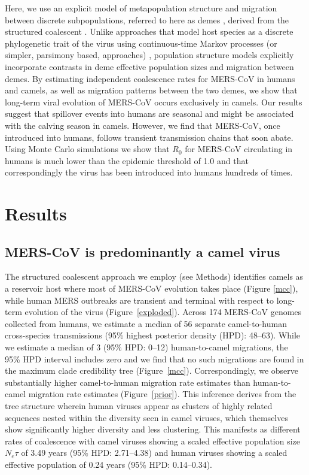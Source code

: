 \documentclass[9pt,lineno]{elife}
\begin{document}
Here, we use an explicit model of metapopulation structure and migration between discrete subpopulations, referred to here as demes \citep{vaughan_efficient_2014}, derived from the structured coalescent \citep{notohara_structured_coalescent_1990}.
Unlike approaches that model host species as a discrete phylogenetic trait of the virus using continuous-time Markov processes (or simpler, parsimony based, approaches) \citep{faria_simultaneously_2013,lycett_h5n8_2016}, population structure models explicitly incorporate contrasts in deme effective population sizes and migration between demes.
By estimating independent coalescence rates for MERS-CoV in humans and camels, as well as migration patterns between the two demes, we show that long-term viral evolution of MERS-CoV occurs exclusively in camels.
Our results suggest that spillover events into humans are seasonal and might be associated with the calving season in camels.
However, we find that MERS-CoV, once introduced into humans, follows transient transmission chains that soon abate.
Using Monte Carlo simulations we show that $R_{0}$ for MERS-CoV circulating in humans is much lower than the epidemic threshold of 1.0 and that correspondingly the virus has been introduced into humans hundreds of times.

\section*{Results}

\subsection*{MERS-CoV is predominantly a camel virus}

The structured coalescent approach we employ (see Methods) identifies camels as a reservoir host where most of MERS-CoV evolution takes place (Figure \ref{mcc}), while human MERS outbreaks are transient and terminal with respect to long-term evolution of the virus (Figure~\ref{exploded}).
Across 174 MERS-CoV genomes collected from humans, we estimate a median of 56 separate camel-to-human cross-species transmissions (95\% highest posterior density (HPD): 48--63).
While we estimate a median of 3 (95\% HPD: 0--12) human-to-camel migrations, the 95\% HPD interval includes zero and we find that no such migrations are found in the maximum clade credibility tree (Figure~\ref{mcc}).
Correspondingly, we observe substantially higher camel-to-human migration rate estimates than human-to-camel migration rate estimates (Figure~\ref{prior}).
This inference derives from the tree structure wherein human viruses appear as clusters of highly related sequences nested within the diversity seen in camel viruses, which themselves show significantly higher diversity and less clustering.
This manifests as different rates of coalescence with camel viruses showing a scaled effective population size $N_e \tau$ of 3.49 years (95\% HPD: 2.71--4.38) and human viruses showing a scaled effective population of 0.24 years (95\% HPD: 0.14--0.34).
\end{document}
